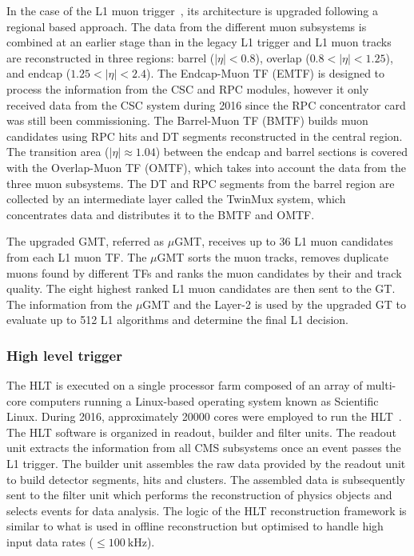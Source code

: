 In the case of the L1 muon trigger~\cite{Stage2L1Muon}, its architecture is upgraded following a regional based approach. The data from the different muon subsystems is combined at an earlier stage than in the legacy L1 trigger and L1 muon tracks are reconstructed in three regions: barrel ($|\eta| < 0.8$), overlap ($0.8 < |\eta| < 1.25$), and endcap ($1.25 < |\eta| < 2.4$). The Endcap-Muon TF (EMTF) is designed to process the information from the CSC and RPC modules, however it only received data from the CSC system during 2016 since the RPC concentrator card was still been commissioning. The Barrel-Muon TF (BMTF) builds muon candidates using RPC hits and DT segments reconstructed in the central region. The transition area ($|\eta| \approx 1.04$) between the endcap and barrel sections is covered with the Overlap-Muon TF (OMTF), which takes into account the data from the three muon subsystems. The DT and RPC segments from the barrel region are collected by an intermediate layer called the TwinMux system, which concentrates data and distributes it to the BMTF and OMTF.

The upgraded GMT, referred as $\mu$GMT, receives up to 36 L1 muon candidates from each L1 muon TF. The $\mu$GMT sorts the muon tracks, removes duplicate muons found by different TFs and ranks the muon candidates by their \pt and track quality. The eight highest ranked L1 muon candidates are then sent to the GT. The information from the $\mu$GMT and the Layer-2 is used by the upgraded GT to evaluate up to 512 L1 algorithms and determine the final L1 decision.

\subsubsection{High level trigger}

The HLT is executed on a single processor farm composed of an array of multi-core computers running a Linux-based operating system known as Scientific Linux. During 2016, approximately 20000 cores were employed to run the HLT~\cite{HLTHardware}. The HLT software is organized in readout, builder and filter units. The readout unit extracts the information from all CMS subsystems once an event passes the L1 trigger. The builder unit assembles the raw data provided by the readout unit to build detector segments, hits and clusters. The assembled data is subsequently sent to the filter unit which performs the reconstruction of physics objects and selects events for data analysis. The logic of the HLT reconstruction framework is similar to what is used in offline reconstruction but optimised to handle high input data rates ($\le\SI{100}{\kHz}$).

